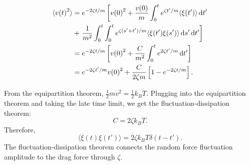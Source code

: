 \begin{align}
  \label{eqn:velocity_squared}
  \begin{split}
  \langle {v(t)}^2 \rangle 
    &= e^{-2 \zeta t / m} \left[ {v(0)}^2
    +  \frac{v(0)}{m}
    \int_0^t e^{\zeta t' / m} \langle \xi(t') \rangle \mathop{}\!\mathrm{d} t' \right. \\
    &+ \left. \frac{1}{m^2} \int_0^t \int_0^t e^{\zeta (s'+t') / m} 
    \langle \xi(t') \xi(s') \rangle \mathop{}\!\mathrm{d} s' \mathop{}\!\mathrm{d} t' \right] \\
    &= e^{-2\zeta t / m} \left[ v{(0)}^2
    + \frac{C}{m^2} \int_0^t e^{2 \zeta t'/m} \mathop{}\!\mathrm{d} t' \right] \\
    &= e^{-2 \zeta t' / m}v{(0)}^2 
    + \frac{C}{2 \zeta m} \left[ 1 - e^{-2 \zeta t/m} \right].
  \end{split}
\end{align}
%

From the equipartition theorem, $\frac{1}{2} m v^2 = \frac{1}{2} k_B T $. 
Plugging  into the equipartition theorem and taking
the late time limit, we get the fluctuation-dissipation theorem:
%
\begin{equation}
C = 2 \zeta k_B T.
\end{equation}
%
Therefore,
\begin{equation}
  \langle \xi( t ) \xi( t') \rangle 
  = 2 \zeta k_B T \delta(t-t').
\end{equation}
%
The fluctuation-dissipation theorem connects the random force fluctuation
amplitude to the drag force through $\zeta$.
